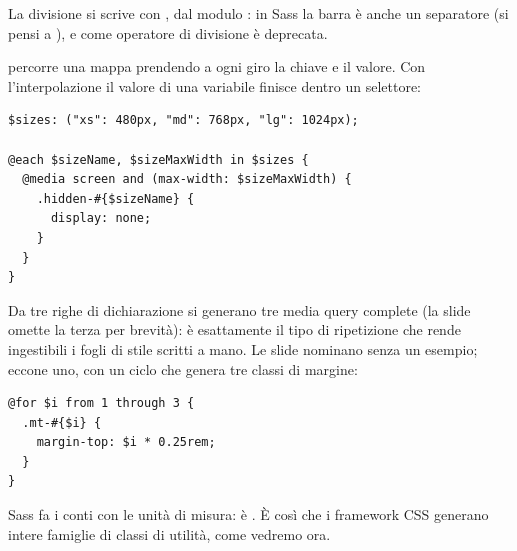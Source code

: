 La divisione si scrive con , dal modulo : in
Sass la barra \code{/} è anche un separatore (si pensi a
), e come operatore di divisione è deprecata.

 percorre una mappa prendendo a ogni giro la chiave e il valore. Con
l'interpolazione \code{\#\{\ldots\}} il valore di una variabile finisce dentro un
selettore:

\begin{affianco}[0.52]
\begin{lstlisting}[style=css, name=hidden.scss]
$sizes: ("xs": 480px, "md": 768px, "lg": 1024px);

@each $sizeName, $sizeMaxWidth in $sizes {
  @media screen and (max-width: $sizeMaxWidth) {
    .hidden-#{$sizeName} {
      display: none;
    }
  }
}
\end{lstlisting}
\risultato
{}
\end{affianco}

Da tre righe di dichiarazione si generano tre media query complete (la slide
omette la terza per brevità): è esattamente il tipo di ripetizione che rende
ingestibili i fogli di stile scritti a mano. Le slide nominano  senza
un esempio; eccone uno, con un ciclo che genera tre classi di margine:

\begin{affianco}[0.52]
\begin{lstlisting}[style=css, name=margini.scss]
@for $i from 1 through 3 {
  .mt-#{$i} {
    margin-top: $i * 0.25rem;
  }
}
\end{lstlisting}
\risultato
{}
\end{affianco}

Sass fa i conti con le unità di misura:  è .
È così che i framework CSS generano intere famiglie di classi di utilità, come
vedremo ora.

